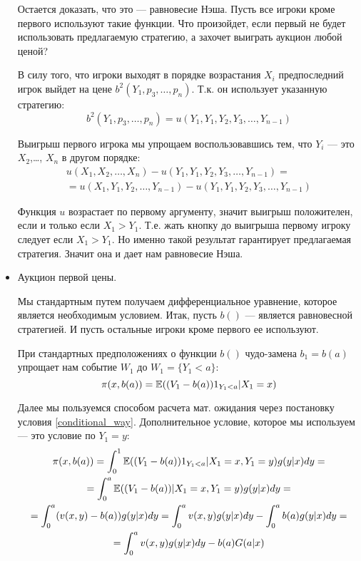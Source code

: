 \begin{itemize}
Остается доказать, что это --- равновесие Нэша. Пусть все игроки кроме первого используют такие функции. Что произойдет, если первый не будет использовать предлагаемую стратегию, а захочет выиграть аукцион любой ценой? 

В силу того, что игроки выходят в порядке возрастания $ X_{i} $ предпоследний игрок выйдет на цене $ b^{2}(Y_{1},p_{3},\ldots,p_{n}) $. Т.к. он использует указанную стратегию:
\begin{equation}
b^{2}(Y_{1},p_{3},\ldots,p_{n}) =u(Y_{1},Y_{1},Y_{2},Y_{3},\ldots,Y_{n-1})
\end{equation}

Выигрыш первого игрока мы упрощаем воспользовавшись тем, что $ Y_{i} $ --- это $ X_{2} $,\ldots, $ X_{n} $ в другом порядке:
\begin{multline}
u(X_{1},X_{2},\ldots,X_{n})-u(Y_{1},Y_{1},Y_{2},Y_{3},\ldots,Y_{n-1})=\\
=u(X_{1},Y_{1},Y_{2},\ldots,Y_{n-1})-u(Y_{1},Y_{1},Y_{2},Y_{3},\ldots,Y_{n-1})
\end{multline}

Функция $ u $ возрастает по первому аргументу, значит выигрыш положителен, если и только если $ X_{1}>Y_{1} $. Т.е. жать кнопку до выигрыша первому игроку следует если $ X_{1}>Y_{1} $. Но именно такой результат гарантирует предлагаемая стратегия. Значит она и дает нам равновесие Нэша.


\item Аукцион первой цены.

Мы стандартным путем получаем дифференциальное уравнение, которое является необходимым условием. Итак, пусть $ b() $ --- является равновесной стратегией. И пусть остальные игроки кроме первого ее используют.

При стандартных предположениях о функции $ b() $ чудо-замена $ b_{1}=b(a) $ упрощает нам событие $ W_{1} $ до $ W_{1}=\{Y_{1}<a\} $:
\begin{equation}
\pi(x,b(a))=\mathbb{E}((V_{1}-b(a))1_{Y_{1}<a}|X_{1}=x)
\end{equation}

Далее мы пользуемся способом расчета мат. ожидания через постановку условия \ref{conditional_way}. Дополнительное условие, которое мы используем --- это условие по $ Y_{1}=y $:
\begin{multline}
\pi(x,b(a))=\int_{0}^{1}\mathbb{E}((V_{1}-b(a))1_{Y_{1}<a}|X_{1}=x,Y_{1}=y)g(y|x)dy=\\
=\int_{0}^{a}\mathbb{E}((V_{1}-b(a))|X_{1}=x,Y_{1}=y)g(y|x)dy=\\
=\int_{0}^{a}(v(x,y)-b(a))g(y|x)dy=\int_{0}^{a}v(x,y)g(y|x)dy-\int_{0}^{a}b(a)g(y|x)dy=\\
=\int_{0}^{a}v(x,y)g(y|x)dy-b(a)G(a|x)
\end{multline}


\end{itemize}
